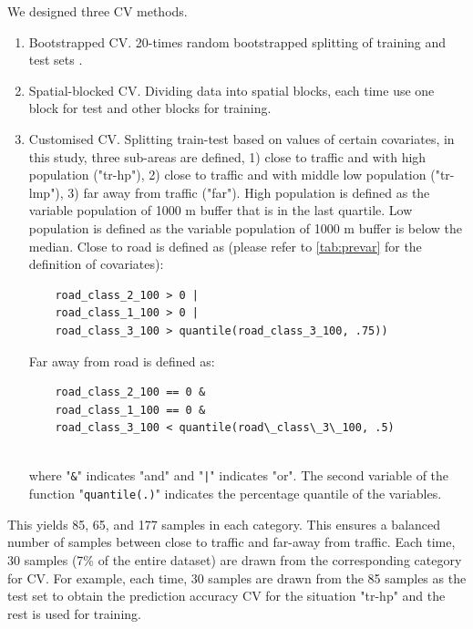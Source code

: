 \documentclass{article}
\begin{document}
We designed three CV methods. 
\begin{enumerate}
\item Bootstrapped CV. 20-times random bootstrapped splitting of training and test sets \citep{luglobal}.  


\item Spatial-blocked CV. Dividing data into spatial blocks, each time use one block for test and other blocks for training. 
    
\item Customised CV. Splitting train-test based on values of certain covariates, in this study, three sub-areas are defined, 1) close to traffic and with high population ("tr-hp"), 2) close to traffic and with middle low population ("tr-lmp"), 3) far away from traffic ("far"). High population is defined as the variable population of 1000 m buffer that is in the last quartile. Low population is defined as the variable population of 1000 m buffer is below the median. Close to road is defined as (please refer to \cref{tab:prevar} for the definition of covariates): 
    \begin{lstlisting} 
    road_class_2_100 > 0 | 
    road_class_1_100 > 0 |
    road_class_3_100 > quantile(road_class_3_100, .75)) \end{lstlisting}
   
    Far away from road is defined as:
  \begin{lstlisting} 
    road_class_2_100 == 0 &
    road_class_1_100 == 0 & 
    road_class_3_100 < quantile(road\_class\_3\_100, .5)
    
    \end{lstlisting}
    where "{\tt \&}" indicates "and" and "{\tt |}" indicates "or". The second variable of the function "{\tt quantile(.)}" indicates the percentage quantile of the variables. 
   
\end{enumerate}
This yields 85, 65, and 177 samples in each category. This ensures a balanced number of samples between close to traffic and far-away from traffic. Each time, 30 samples (7\% of the entire dataset) are drawn from the corresponding category for CV. For example, each time, 30 samples are drawn from the 85 samples as the test set to obtain the prediction accuracy CV for the situation "tr-hp" and the rest is used for training.  
\end{document}
